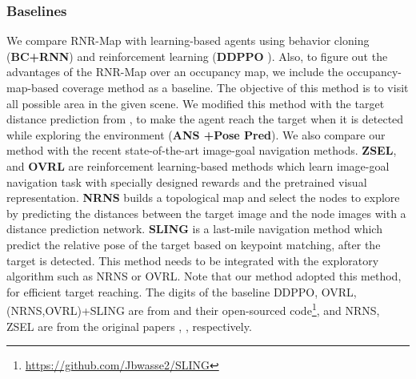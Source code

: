 \documentclass[10pt,twocolumn,letterpaper]{article}
\def\proposed{RNR-Map\xspace}
\begin{document}
\subsubsection{Baselines}
\vspace{-0.2cm}
We compare \proposed with learning-based agents using behavior cloning (\textbf{BC+RNN}) and reinforcement learning (\textbf{DDPPO} \cite{DDPPO}). Also, to figure out the advantages of the \proposed over an occupancy map, we include the occupancy-map-based coverage method \cite{occ_ans} as a baseline. The objective of this method is to visit all possible area in the given scene.
We modified this method with the target distance prediction from \cite{NRNS}, to make the agent reach the target when it is detected while exploring the environment (\textbf{ANS \cite{occ_ans}+Pose Pred}).
We also compare our method with the recent state-of-the-art image-goal navigation methods.
\textbf{ZSEL}\cite{ZSEL}, and \textbf{OVRL}\cite{OVRL} are reinforcement learning-based methods which learn image-goal navigation task with specially designed rewards and the pretrained visual representation.
%
\textbf{NRNS} builds a topological map and select the nodes to explore by predicting the distances between the target image and the node images with a distance prediction network.
%
\textbf{SLING} is a last-mile navigation method which predict the relative pose of the target based on keypoint matching, after the target is detected.
%
This method needs to be integrated with the exploratory algorithm such as NRNS or OVRL. 
%
Note that our method adopted this method, for efficient target reaching. 
%
The digits of the baseline DDPPO, OVRL, (NRNS,OVRL)+SLING are from \cite{SLING} and their open-sourced code\footnote{\url{https://github.com/Jbwasse2/SLING}}, and NRNS, ZSEL are from the original papers \cite{NRNS}, \cite{ZSEL}, respectively. 
%  
\vspace{-0.3cm}
\end{document}
